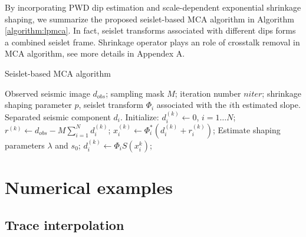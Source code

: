 By incorporating PWD dip estimation and scale-dependent exponential shrinkage shaping, we summarize the proposed seislet-based MCA algorithm in Algorithm \ref{algorithm:lpmca}. In fact, seislet transforms associated with different dips forms a combined seislet frame. Shrinkage operator plays an role of crosstalk removal in MCA algorithm, see more details in Appendex A.

\begin{algorithm}[htb]
    \caption{Seislet-based MCA algorithm}\label{algorithm:lpmca}
    \begin{algorithmic}[1]
    \renewcommand{\algorithmicrequire}{\textbf{Input:}}
    \REQUIRE Observed seismic image $d_{obs}$; sampling mask $M$; iteration number $niter$; shrinkage shaping parameter $p$, seislet transform $\Phi_i$  associated with the $i$th estimated slope.
    \renewcommand{\algorithmicensure}{\textbf{Output:}}
    \ENSURE Separated seismic component $d_i$.
    \STATE Initialize: $d_i^{(k)}\leftarrow 0$, $ i=1\ldots N$;
            \STATE  $r^{(k)} \leftarrow d_{obs}-M\sum_{i=1}^N d_i^{(k)}$;
                \STATE  $x_i^{(k)}\leftarrow \Phi_i^*(d_i^{(k)}+r_i^{(k)})$;
                \STATE  Estimate shaping parameters $\lambda$ and $s_0$;
                \STATE  $d_i^{(k)}\leftarrow \Phi_i S(x_i^k) $;
            \ENDFOR
        \ENDFOR
    \end{algorithmic}
\end{algorithm}


\section{Numerical examples}

\subsection{Trace interpolation}

